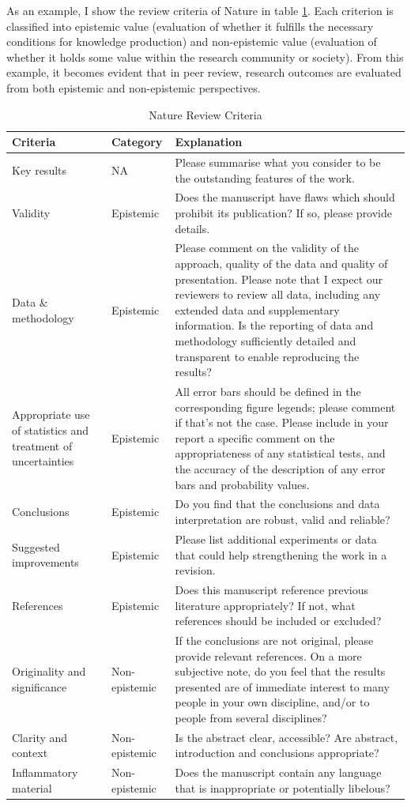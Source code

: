 \documentclass{book}
\begin{document}
As an example, I show the review criteria of Nature in table \ref{tab:nature_review}. Each criterion is classified into epistemic value (evaluation of whether it fulfills the necessary conditions for knowledge production) and non-epistemic value (evaluation of whether it holds some value within the research community or society). From this example, it becomes evident that in peer review, research outcomes are evaluated from both epistemic and non-epistemic perspectives. 

\begin{table}[H]
\centering
\begin{tabularx}{\textwidth}{|X|X|X|}
\hline
\textbf{Criteria} & \textbf{Category} & \textbf{Explanation} \\ 
\hline
Key results & NA & Please summarise what you consider to be the outstanding features of the work. \\ 
\hline
Validity & Epistemic & Does the manuscript have flaws which should prohibit its publication? If so, please provide details. \\ 
\hline
Data \& methodology & Epistemic & Please comment on the validity of the approach, quality of the data and quality of presentation. Please note that I expect our reviewers to review all data, including any extended data and supplementary information. Is the reporting of data and methodology sufficiently detailed and transparent to enable reproducing the results? \\ 
\hline
Appropriate use of statistics and treatment of uncertainties & Epistemic & All error bars should be defined in the corresponding figure legends; please comment if that’s not the case. Please include in your report a specific comment on the appropriateness of any statistical tests, and the accuracy of the description of any error bars and probability values. \\ 
\hline
Conclusions & Epistemic & Do you find that the conclusions and data interpretation are robust, valid and reliable? \\ 
\hline
Suggested improvements & Epistemic & Please list additional experiments or data that could help strengthening the work in a revision. \\ 
\hline
References & Epistemic & Does this manuscript reference previous literature appropriately? If not, what references should be included or excluded? \\ 
\hline
Originality and significance & Non-epistemic & If the conclusions are not original, please provide relevant references. On a more subjective note, do you feel that the results presented are of immediate interest to many people in your own discipline, and/or to people from several disciplines? \\ 
\hline
Clarity and context & Non-epistemic & Is the abstract clear, accessible? Are abstract, introduction and conclusions appropriate? \\ 
\hline
Inflammatory material & Non-epistemic & Does the manuscript contain any language that is inappropriate or potentially libelous? \\ 
\hline
\end{tabularx}
\caption{Nature Review Criteria}
\label{tab:nature_review}
\end{table}
\end{document}
